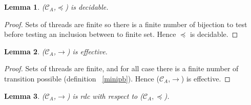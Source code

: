 \documentclass[a4paper,10pt]{report}
\newtheorem{lm}{Lemma}[thr]
\newcommand{\C}{\mathcal{C}_{A}}
\begin{document}
\begin{lm} \label{cd2}
  ($\C$,$\preceq$) is decidable.
\end{lm}
\begin{proof}
  Sets of threads are finite so there is a finite number of bijection to test before testing an inclusion between to finite set.
  Hence $\preceq$ is decidable.
\end{proof}

\begin{lm} \label{cd3}
  ($\C$,$\rightarrow$) is effective.
\end{lm}

\begin{proof}
   Sets of threads are finite, and for all case there is a finite number of transition possible (definition ~\ref{minipb}).
   Hence ($\C$,$\rightarrow$) is effective.
\end{proof}

\begin{lm} \label{cd4}
  ($\C$,$\rightarrow$) is rdc with respect to ($\C,\preceq$).
\end{lm}
\end{document}
